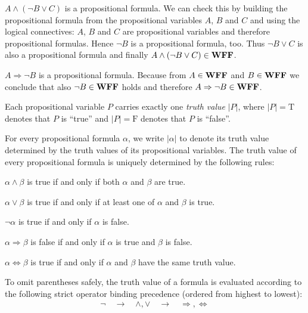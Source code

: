 \begin{examples}
    \begin{exampleenumerate}
        \item $A\land (\lnot B\lor C)$ is a propositional formula. We can check this by building the propositional formula from the propositional variables $A$, $B$ and $C$ and using the logical connectives: $A$, $B$ and $C$ are propositional variables and therefore propositional formulas. Hence $\lnot B$ is a propositional formula, too. Thus $\lnot B\lor C$ is also a propositional formula and finally $A\land (\lnot B\lor C)\in\mathbf{WFF}$.
        \item $A\Rightarrow\lnot B$ is a propositional formula. Because from $A\in\mathbf{WFF}$ and $B\in\mathbf{WFF}$ we conclude that also $\lnot B\in\mathbf{WFF}$ holds and therefore $A\Rightarrow\lnot B\in\mathbf{WFF}$.
    \end{exampleenumerate}
\end{examples}

\begin{definition}[Semantics]
    Each propositional variable $P$ carries exactly one \emph{truth value} $|P|$, where $|P|=\text{T}$ denotes that $P$ is \enquote{true} and $|P|=\text{F}$ denotes that $P$ is \enquote{false}.

    For every propositional formula $\alpha$, we write $|\alpha|$ to denote its truth value determined by the truth values of its propositional variables. The truth value of every propositional formula is uniquely determined by the following rules:

    \begin{definitionenumerate}
        \item $\alpha\land\beta$ is true if and only if both $\alpha$ and $\beta$ are true.
        \item $\alpha\lor\beta$ is true if and only if at least one of $\alpha$ and $\beta$ is true.
        \item $\lnot\alpha$ is true if and only if $\alpha$ is false.
        \item $\alpha\Rightarrow\beta$ is false if and only if $\alpha$ is true and $\beta$ is false.
        \item $\alpha\Leftrightarrow\beta$ is true if and only if $\alpha$ and $\beta$ have the same truth value.
    \end{definitionenumerate}

    To omit parentheses safely, the truth value of a formula is evaluated according to the following strict operator binding precedence (ordered from highest to lowest):
    \begin{align*}\lnot \quad \longrightarrow \quad \land, \lor \quad \longrightarrow \quad \Rightarrow, \Leftrightarrow\end{align*}
\end{definition}

